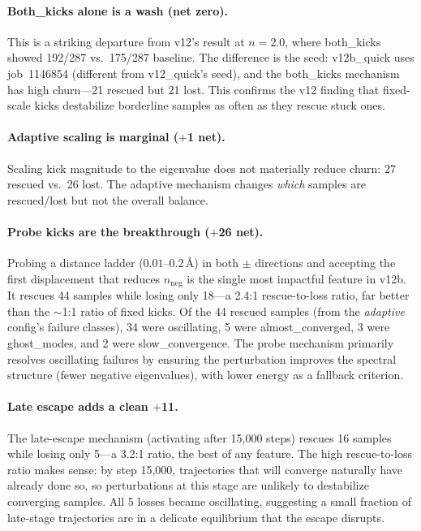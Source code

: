 \documentclass[11pt,a4paper]{article}
\theoremstyle{definition}
\begin{document}
\paragraph{Both\_kicks alone is a wash (net zero).}
This is a striking departure from v12's result at $n=2.0$, where
both\_kicks showed 192/287 vs.\ 175/287 baseline.  The difference is
the seed: v12b\_quick uses job~1146854 (different from v12\_quick's seed),
and the both\_kicks mechanism has high churn---21 rescued but 21 lost.
This confirms the v12 finding that fixed-scale kicks destabilize
borderline samples as often as they rescue stuck ones.

\paragraph{Adaptive scaling is marginal ($+$1 net).}
Scaling kick magnitude to the eigenvalue does not materially reduce
churn: 27 rescued vs.\ 26 lost.  The adaptive mechanism changes
\emph{which} samples are rescued/lost but not the overall balance.

\paragraph{Probe kicks are the breakthrough ($+$26 net).}
Probing a distance ladder ($0.01$--$0.2$\,\AA) in both $\pm$ directions
and accepting the first displacement that reduces $n_\text{neg}$
is the single most impactful feature in v12b.  It rescues 44 samples
while losing only 18---a 2.4:1 rescue-to-loss ratio, far better than the
$\sim$1:1 ratio of fixed kicks.  Of the 44 rescued samples (from the
\emph{adaptive} config's failure classes), 34 were oscillating, 5 were
almost\_converged, 3 were ghost\_modes, and 2 were slow\_convergence.
The probe mechanism primarily resolves oscillating failures by ensuring
the perturbation improves the spectral structure (fewer negative
eigenvalues), with lower energy as a fallback criterion.

\paragraph{Late escape adds a clean $+$11.}
The late-escape mechanism (activating after 15{,}000 steps) rescues 16
samples while losing only 5---a 3.2:1 ratio, the best of any feature.
The high rescue-to-loss ratio makes sense: by step 15{,}000, trajectories
that will converge naturally have already done so, so perturbations at
this stage are unlikely to destabilize converging samples.  All 5 losses
became oscillating, suggesting a small fraction of late-stage trajectories
are in a delicate equilibrium that the escape disrupts.
\end{document}
